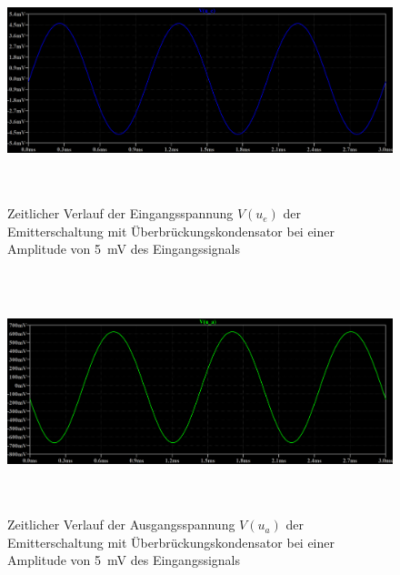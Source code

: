 \documentclass[12pt,english,ngerman]{scrartcl}
\begin{document}
\begin{figure}[H]
    \centering
    \includegraphics[width=\linewidth, height=7cm]{./figures/mitkond/eingangssignal6mv.png}
    \caption{Zeitlicher Verlauf der Eingangsspannung $V(u_e)$ 
    der Emitterschaltung mit Überbrückungskondensator bei einer Amplitude von
  \SI{5}{mV} des Eingangssignals}
    \label{fig:sim_mit_normal_eingang}
\end{figure}

\begin{figure}[H]
    \centering
    \includegraphics[width=\linewidth, height=7cm]{./figures/mitkond/ausgangssignal6mv.png}
    \caption{Zeitlicher Verlauf der Ausgangsspannung $V(u_a)$
    der Emitterschaltung mit Überbrückungskondensator bei einer Amplitude von
  \SI{5}{mV} des Eingangssignals}
    \label{fig:sim_mit_normal_ausgang}
\end{figure}

\end{document}
